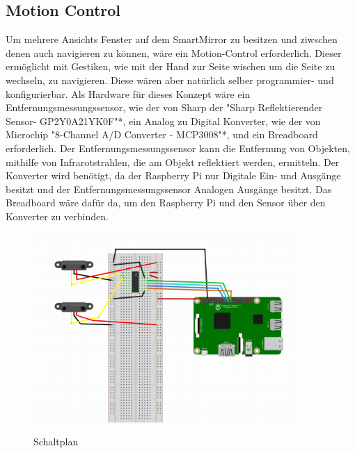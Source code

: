 \subsection{Motion Control}
Um mehrere Ansichts Fenster auf dem SmartMirror zu besitzen und ziwschen denen auch navigieren zu können, wäre ein Motion-Control erforderlich. Dieser ermöglicht mit Gestiken, wie mit der Hand zur Seite wischen um die Seite zu wechseln, zu navigieren. Diese wären aber natürlich selber programmier- und konfigurierbar. 
Als Hardware für dieses Konzept wäre ein Entfernungsmessungssensor, wie der von Sharp der "Sharp Reflektierender Sensor- GP2Y0A21YK0F"*, ein Analog zu Digital Konverter, wie der von Microchip "8-Channel A/D Converter - MCP3008"*, und ein Breadboard erforderlich.
Der Entfernungsmessungssensor kann die Entfernung von Objekten, mithilfe von Infrarotstrahlen, die am Objekt reflektiert werden, ermitteln. Der Konverter wird benötigt, da der Raspberry Pi nur Digitale Ein- und Ausgänge besitzt und der Entfernungsmessungssensor Analogen Ausgänge besitzt. Das Breadboard wäre dafür da, um den Raspberry Pi und den Sensor über den Konverter zu verbinden.
\begin{figure}
\includegraphics[width=100mm]{pictures/Motion-Control_Plan.PNG}
\caption{Schaltplan}
\end{figure}